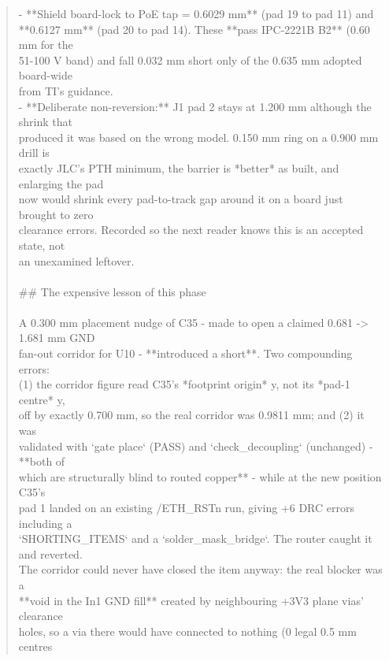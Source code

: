 \documentclass[11pt,a4paper]{article}
\begin{document}
\begin{quote}
- {*}{*}Shield board-lock to PoE tap = 0.6029 mm{*}{*} (pad 19 to pad 11) and\\
  {*}{*}0.6127 mm{*}{*} (pad 20 to pad 14). These {*}{*}pass IPC-2221B B2{*}{*} (0.60 mm for the\\
  51-100 V band) and fall 0.032 mm short only of the 0.635 mm adopted board-wide\\
  from TI's guidance.\\
- {*}{*}Deliberate non-reversion:{*}{*} J1 pad 2 stays at 1.200 mm although the shrink that\\
  produced it was based on the wrong model. 0.150 mm ring on a 0.900 mm drill is\\
  exactly JLC's PTH minimum, the barrier is {*}better{*} as built, and enlarging the pad\\
  now would shrink every pad-to-track gap around it on a board just brought to zero\\
  clearance errors. Recorded so the next reader knows this is an accepted state, not\\
  an unexamined leftover.\\
~\\
\#\# The expensive lesson of this phase\\
~\\
A 0.300 mm placement nudge of C35 - made to open a claimed 0.681 -\textgreater{} 1.681 mm GND\\
fan-out corridor for U10 - {*}{*}introduced a short{*}{*}. Two compounding errors:\\
(1) the corridor figure read C35's {*}footprint origin{*} y, not its {*}pad-1 centre{*} y,\\
off by exactly 0.700 mm, so the real corridor was 0.9811 mm; and (2) it was\\
validated with `gate place` (PASS) and `check\_decoupling` (unchanged) - {*}{*}both of\\
which are structurally blind to routed copper{*}{*} - while at the new position C35's\\
pad 1 landed on an existing /ETH\_RSTn run, giving +6 DRC errors including a\\
`SHORTING\_ITEMS` and a `solder\_mask\_bridge`. The router caught it and reverted.\\
The corridor could never have closed the item anyway: the real blocker was a\\
{*}{*}void in the In1 GND fill{*}{*} created by neighbouring +3V3 plane vias' clearance\\
holes, so a via there would have connected to nothing (0 legal 0.5 mm centres\\

\end{quote}
\end{document}
